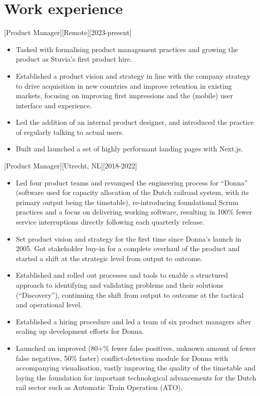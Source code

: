 \documentclass[10pt]{article}
\begin{document}
\makecvtitle

\section{Work experience}
\label{sec:work}

[Product Manager][Remote][2023-present]
\begin{itemize}
    \item Tasked with formalising product management practices and growing the product as Stuvia's first product hire.
    \item Established a product vision and strategy in line with the company strategy to drive acquisition in new countries and improve retention in existing markets, focusing on improving first impressions and the (mobile) user interface and experience.
    \item Led the addition of an internal product designer, and introduced the practice of regularly talking to actual users.
    \item Built and launched a set of highly performant landing pages with Next.js.
\end{itemize}

[Product Manager][Utrecht, NL][2018-2022]
\begin{itemize}
    \item Led four product teams and revamped the engineering process for \enquote{Donna} (software used for capacity allocation of the Dutch railroad system, with its primary output being the timetable), re-introducing foundational Scrum practices and a focus on delivering working software, resulting in 100\% fewer service interruptions directly following each quarterly release.
    \item Set product vision and strategy for the first time since Donna's launch in 2005. Got stakeholder buy-in for a complete overhaul of the product and started a shift at the strategic level from output to outcome.
    \item Established and rolled out processes and tools to enable a structured approach to identifying and validating problems and their solutions (\enquote{Discovery}), continuing the shift from output to outcome at the tactical and operational level.
    \item Established a hiring procedure and led a team of six product managers after scaling up development efforts for Donna.
    \item Launched an improved (80+\% fewer false positives, unknown amount of fewer false negatives, 50\% faster) conflict-detection module for Donna with accompanying visualisation, vastly improving the quality of the timetable and laying the foundation for important technological advancements for the Dutch rail sector such as Automatic Train Operation (ATO).
\end{itemize}
\end{document}
